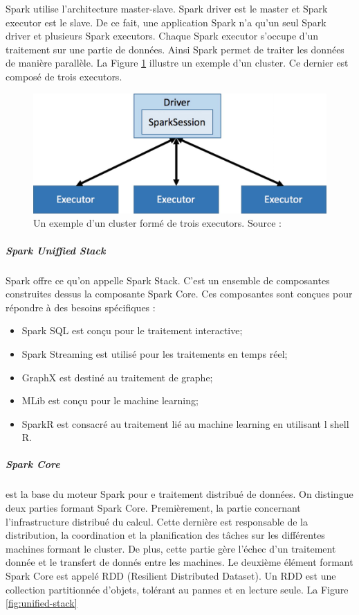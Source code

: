 Spark utilise l'architecture master-slave. Spark driver est le master et Spark executor est le slave. De ce fait, une application Spark n'a qu'un seul Spark driver et plusieurs Spark executors. Chaque Spark executor s'occupe d'un traitement  sur une partie de données. Ainsi Spark permet de traiter  les données de manière parallèle. La Figure \ref{fig:small-cluster-3} illustre un exemple d'un cluster. Ce dernier est composé de trois executors.
\begin{figure}[H]
	\centering
	\includegraphics[width=0.7\linewidth]{illustrations/small-cluster-3}
	\caption{Un exemple d'un cluster formé de trois executors. Source : \cite{eginning-Apache-Spark-2-cluster-example}}
	\label{fig:small-cluster-3}
\end{figure}


\subparagraph{Spark Uniffied Stack} Spark offre ce qu'on appelle Spark Stack. C'est un ensemble de composantes construites dessus la composante Spark Core.  Ces composantes sont conçues pour répondre à des besoins spécifiques :
\begin{itemize}
	\item Spark SQL  est conçu pour le traitement interactive;
	\item Spark Streaming est utilisé pour les traitements en temps réel;
	\item  GraphX est destiné au traitement de graphe;
	\item MLib est conçu pour le machine learning;
	\item SparkR est consacré au traitement lié au machine learning en utilisant l shell R.
	
\end{itemize}

\subparagraph{Spark Core} est la base du moteur Spark pour e traitement distribué de données.  On distingue deux parties formant Spark Core. Premièrement, la partie concernant l'infrastructure distribué du calcul. Cette dernière est responsable de la distribution, la coordination et la planification des tâches  sur les différentes machines formant le cluster. De plus, cette partie gère l'échec d'un traitement donnée et le transfert de donnés entre les machines. Le deuxième élément formant Spark Core est appelé RDD (Resilient Distributed Dataset). Un RDD est une collection partitionnée d'objets, tolérant au pannes et en lecture seule. 
La Figure \ref{fig:unified-stack} 

